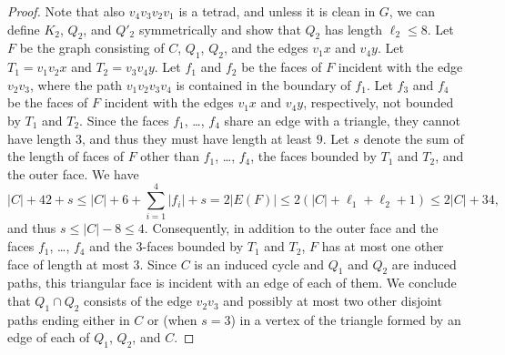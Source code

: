 \documentclass[12pt,twoside,openright,a4paper]{book}
\begin{document}
\begin{proof}
Note that also $v_4v_3v_2v_1$ is a tetrad, and unless it is clean in $G$, we can define $K_2$, $Q_2$, and $Q'_2$
symmetrically and show that $Q_2$ has length $\ell_2\le 8$.  Let $F$ be the graph consisting of $C$, $Q_1$, $Q_2$, and the edges $v_1x$ and $v_4y$.
Let $T_1=v_1v_2x$ and $T_2=v_3v_4y$.  Let $f_1$ and $f_2$ be the faces of $F$ incident with the edge $v_2v_3$, where the path $v_1v_2v_3v_4$
is contained in the boundary of $f_1$.  Let $f_3$ and $f_4$ be the faces of $F$ incident with the edges $v_1x$ and $v_4y$, respectively,
not bounded by $T_1$ and $T_2$.  Since the faces $f_1$, \ldots, $f_4$ share an edge with a triangle, they cannot have length $3$, and thus
they must have length at least $9$.  Let $s$ denote the sum of the length of faces of $F$ other than $f_1$, \ldots, $f_4$, the faces bounded by $T_1$ and $T_2$,
and the outer face.  We have
\begin{equation}\label{eq:facesizes}
|C|+42+s\le |C|+6+\sum_{i=1}^4|f_i|+s=2|E(F)|\le 2(|C|+\ell_1+\ell_2+1)\le 2|C|+34,
\end{equation}
and thus $s\le |C|-8\le 4$.  Consequently, in addition to the outer face and the faces $f_1$, \ldots, $f_4$ and the 3-faces bounded by $T_1$
and $T_2$, $F$ has at most one other face of length at most $3$.  Since $C$ is an induced cycle and $Q_1$ and $Q_2$
are induced paths, this triangular face is incident with an edge of each of them.  We conclude that $Q_1\cap Q_2$ consists
of the edge $v_2v_3$ and possibly at most two other disjoint paths ending either in $C$ or (when $s=3$) in a vertex of the triangle
formed by an edge of each of $Q_1$, $Q_2$, and $C$.


\end{proof}
\end{document}
